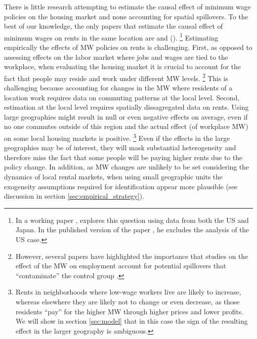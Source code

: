 
There is little research attempting to estimate the causal effect of minimum wage 
policies on the housing market and none accounting for spatial spillovers.
To the best of our knowledge, the only papers that estimate the causal effect of 
minimum wages on rents in the same location are \textcite{Tidemann2018} and 
\citeauthor{Yamagishi2019} (\citeyear{Yamagishi2019, Yamagishi2021}).%
\footnote{In a working paper \parencite{Yamagishi2019}, explores this question 
	using data from both the US and Japan. In the published version of the 
	paper \parencite{Yamagishi2021}, he excludes the analysis of the US case.}
Estimating empirically the effects of MW policies on rents is challenging. 
First, as opposed to assessing effects on the labor market where jobs and wages 
are tied to the workplace, when evaluating the housing market it is crucial to 
account for the fact that people may reside and work under different MW levels.%
\footnote{However, several papers have highlighted the importance that studies
on the effect of the MW on employment account for potential spillovers that
``contaminate'' the control group \parencite{Kuehn2016, Huang2020}.}
This is challenging because accounting for changes in the MW where residents
of a location work requires data on commuting patterns at the local level.
Second, estimation at the local level requires spatially dissagregated data on 
rents.
Using large geographies might result in null or even negative effects on average,
even if no one commutes outside of this region and the actual effect (of workplace
MW) on some local housing markets is positive.%
\footnote{Rents in neighborhoods where low-wage workers live are likely to 
	increase, whereas elsewhere they are likely not to change or even decrease, 
	as those residents ``pay'' for the higher MW through higher prices and 
	lower profits. We will show in section \ref{sec:model} that in this case 
	the sign of the resulting effect in the larger geography is ambiguous.}
Even if the effects in the large geographies may be of interest, they will mask 
substantial heterogeneity and therefore miss the fact that some people will be 
paying higher rents due to the policy change.
In addition, as MW changes are unlikely to be set considering the dynamics of 
local rental markets, when using small geographic units the exogeneity assumptions 
required for identification appear more plausible (see discussion in 
section \ref{sec:empirical_strategy}). 

